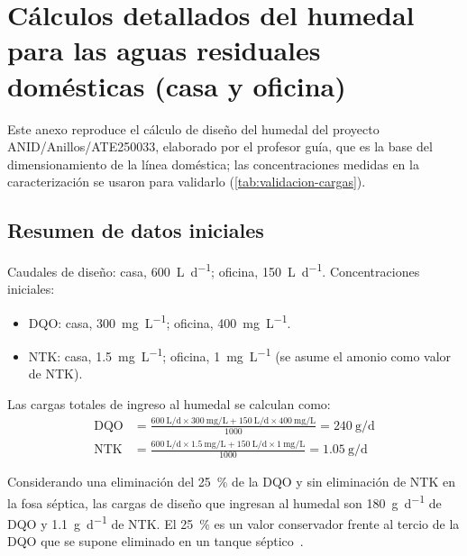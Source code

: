 \chapter{Cálculos detallados del humedal para las aguas residuales domésticas (casa y oficina)}
\label{anx:calculos-humedal}

Este anexo reproduce el cálculo de diseño del humedal del proyecto ANID/Anillos/ATE250033, elaborado por el profesor guía, que es la base del dimensionamiento de la línea doméstica; las concentraciones medidas en la caracterización se usaron para validarlo (\cref{tab:validacion-cargas}).

\section{Resumen de datos iniciales}

Caudales de diseño: casa, \qty{600}{\liter\per\day}; oficina, \qty{150}{\liter\per\day}.
Concentraciones iniciales:
\begin{itemize}
  \item DQO: casa, \qty{300}{\milli\gram\per\liter}; oficina, \qty{400}{\milli\gram\per\liter}.
  \item NTK: casa, \qty{1.5}{\milli\gram\per\liter}; oficina, \qty{1}{\milli\gram\per\liter} (se asume el amonio como valor de NTK).
\end{itemize}


Las cargas totales de ingreso al humedal se calculan como:
\begin{align*}
  \mathrm{DQO} &= \frac{\qty{600}{\liter\per\day} \times \qty{300}{\milli\gram\per\liter} + \qty{150}{\liter\per\day} \times \qty{400}{\milli\gram\per\liter}}{1000} = \qty{240}{\gram\per\day} \\
  \mathrm{NTK} &= \frac{\qty{600}{\liter\per\day} \times \qty{1.5}{\milli\gram\per\liter} + \qty{150}{\liter\per\day} \times \qty{1}{\milli\gram\per\liter}}{1000} = \qty{1.05}{\gram\per\day}
\end{align*}

Considerando una eliminación del \qty{25}{\percent} de la DQO y sin eliminación de NTK en la fosa séptica, las cargas de diseño que ingresan al humedal son \qty{180}{\gram\per\day} de DQO y \qty{1.1}{\gram\per\day} de NTK.
El \qty{25}{\percent} es un valor conservador frente al tercio de la DQO que se supone eliminado en un tanque séptico~\parencite{dotro2021humedales}.

